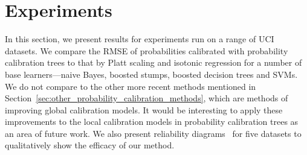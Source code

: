 \documentclass[wcp]{jmlr}
\begin{document}
\section{\label{sec:experiments}Experiments}
In this section, we present results for experiments run on a range of UCI datasets. We compare the RMSE of probabilities calibrated with probability calibration trees to that by Platt scaling and isotonic regression for a number of base learners---naive Bayes, boosted stumps, boosted decision trees and SVMs. We do not compare to the other more recent methods mentioned in Section~\ref{sec:other_probability_calibration_methods}, which are methods of improving global calibration models. It would be interesting to apply these improvements to the local calibration models in probability calibration trees as an area of future work. We also present reliability diagrams~\citep{degroot1983comparison} for five datasets to qualitatively show the efficacy of our method. 
\end{document}
